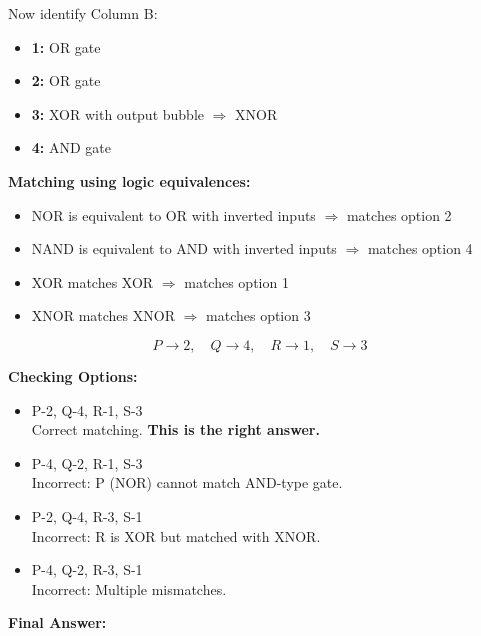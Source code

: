 \documentclass[12pt,a4paper]{article}
\begin{document}
Now identify Column B:

\begin{itemize}
\item \textbf{1:} OR gate
\item \textbf{2:} OR gate
\item \textbf{3:} XOR with output bubble $\Rightarrow$ XNOR
\item \textbf{4:} AND gate
\end{itemize}

\textbf{Matching using logic equivalences:}

\begin{itemize}
\item NOR is equivalent to OR with inverted inputs $\Rightarrow$ matches option 2
\item NAND is equivalent to AND with inverted inputs $\Rightarrow$ matches option 4
\item XOR matches XOR $\Rightarrow$ matches option 1
\item XNOR matches XNOR $\Rightarrow$ matches option 3
\end{itemize}

\[
\boxed{P \rightarrow 2,\quad Q \rightarrow 4,\quad R \rightarrow 1,\quad S \rightarrow 3}
\]

\vspace{0.5cm}

\textbf{Checking Options:}

\begin{itemize}

\item[(A)] P-2, Q-4, R-1, S-3 \\
Correct matching. \textbf{This is the right answer.}

\item[(B)] P-4, Q-2, R-1, S-3 \\
Incorrect: P (NOR) cannot match AND-type gate.

\item[(C)] P-2, Q-4, R-3, S-1 \\
Incorrect: R is XOR but matched with XNOR.

\item[(D)] P-4, Q-2, R-3, S-1 \\
Incorrect: Multiple mismatches.

\end{itemize}

\vspace{0.5cm}

\textbf{Final Answer:} 
\end{document}

